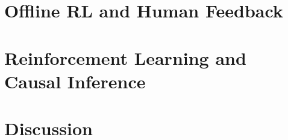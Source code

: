 \section{Offline RL and Human Feedback}\label{section:offline_rl}



\section{Reinforcement Learning and Causal Inference}\label{section:causal_rl}


\section{Discussion}\label{section:conclusion}






